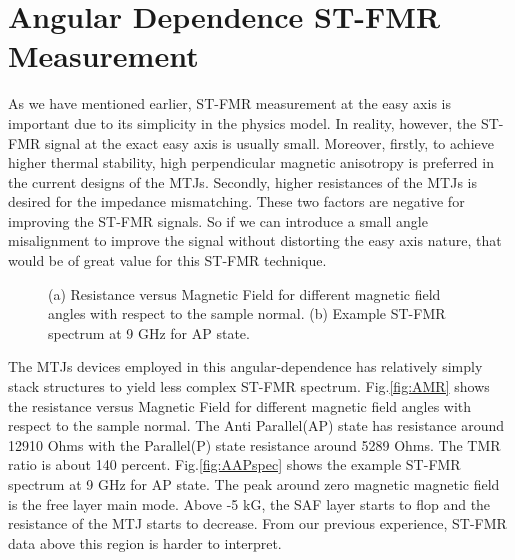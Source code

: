 \section{Angular Dependence ST-FMR Measurement}

As we have mentioned earlier, ST-FMR measurement at the easy axis is important due to its simplicity in the physics model. In reality, however, the ST-FMR signal at the exact easy axis is usually small. Moreover, firstly, to achieve higher thermal stability, high perpendicular magnetic anisotropy is preferred in the current designs of the MTJs. Secondly, higher resistances of the MTJs is desired for the impedance mismatching. These two factors are negative for improving the ST-FMR signals. So if we can introduce a small angle misalignment to improve the signal without distorting the easy axis nature, that would be of great value for this ST-FMR technique.

\begin{figure}[!ht]
\centering
{}
\caption{(a) Resistance versus Magnetic Field for different magnetic field angles with respect to the sample normal. (b) Example ST-FMR spectrum at 9 GHz  for AP state.}
\end{figure}

The MTJs devices employed in this angular-dependence has relatively simply stack structures to yield less complex ST-FMR spectrum. Fig.\ref{fig:AMR} shows the resistance versus Magnetic Field for different magnetic field angles with respect to the sample normal. The Anti Parallel(AP) state has resistance around 12910 Ohms with the Parallel(P) state resistance around 5289 Ohms. The TMR ratio is about 140 percent. Fig.\ref{fig:AAPspec} shows the example ST-FMR spectrum at 9 GHz  for AP state. The peak around zero magnetic magnetic field is the free layer main mode. Above -5 kG, the SAF layer starts to flop and the resistance of the MTJ starts to decrease. From our previous experience, ST-FMR data above this region is harder to interpret. 


